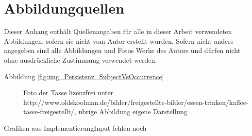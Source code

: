 \chapter{Abbildungquellen}

Dieser Anhang enthält Quellenangaben für alle in dieser Arbeit verwendeten Abbildungen, sofern sie nicht vom Autor erstellt wurden. Sofern nicht anders angegeben sind alle Abbildungen und Fotos Werke des Autors und dürfen nicht ohne ausdrückliche Zustimmung verwendet werden.

\begin{description}
 \item[Abbildung \ref{fig:img_Persistenz_SubjectVsOccurrence}] Foto der Tasse lizenzfrei unter http://www.oldskoolman.de/bilder/freigestellte-bilder/essen-trinken/kaffee-tasse-freigestellt/, übrige Abbildung eigene Darstellung
 \end{description}

Grafiken aus ImplementierungInput fehlen noch